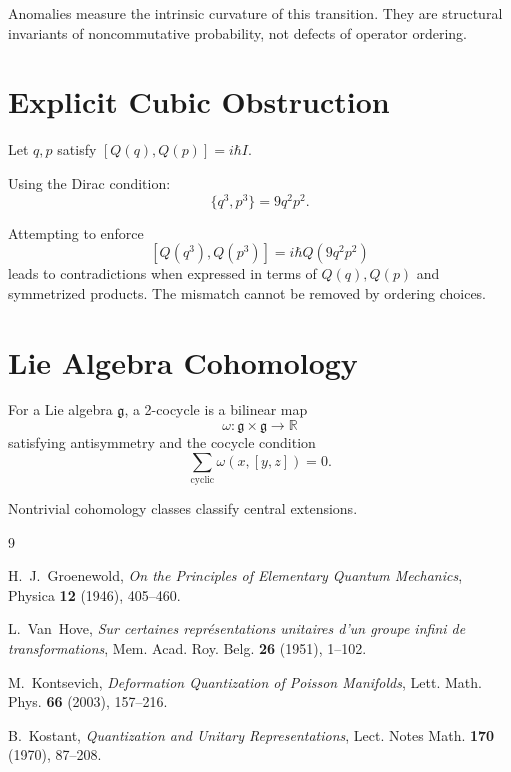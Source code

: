 \documentclass[11pt]{article}
\theoremstyle{definition}
\theoremstyle{remark}
\begin{document}
Anomalies measure the intrinsic curvature of this transition. They are structural invariants of noncommutative probability, not defects of operator ordering.

\appendix

\section{Explicit Cubic Obstruction}

Let $q,p$ satisfy $[Q(q),Q(p)] = i\hbar I$.

Using the Dirac condition:
\[
\{q^3,p^3\} = 9 q^2 p^2.
\]

Attempting to enforce
\[
[Q(q^3),Q(p^3)] = i\hbar Q(9q^2p^2)
\]
leads to contradictions when expressed in terms of $Q(q),Q(p)$ and symmetrized products. The mismatch cannot be removed by ordering choices.

\section{Lie Algebra Cohomology}

For a Lie algebra $\mathfrak{g}$, a 2-cocycle is a bilinear map
\[
\omega: \mathfrak{g} \times \mathfrak{g} \to \mathbb{R}
\]
satisfying antisymmetry and the cocycle condition
\[
\sum_{\text{cyclic}} \omega(x,[y,z]) = 0.
\]

Nontrivial cohomology classes classify central extensions.

\begin{thebibliography}{9}

H.~J.~Groenewold,
\textit{On the Principles of Elementary Quantum Mechanics},
Physica \textbf{12} (1946), 405--460.

L.~Van~Hove,
\textit{Sur certaines représentations unitaires d'un groupe infini de transformations},
Mem. Acad. Roy. Belg. \textbf{26} (1951), 1--102.

M.~Kontsevich,
\textit{Deformation Quantization of Poisson Manifolds},
Lett. Math. Phys. \textbf{66} (2003), 157--216.

B.~Kostant,
\textit{Quantization and Unitary Representations},
Lect. Notes Math. \textbf{170} (1970), 87--208.

\end{thebibliography}
\end{document}
